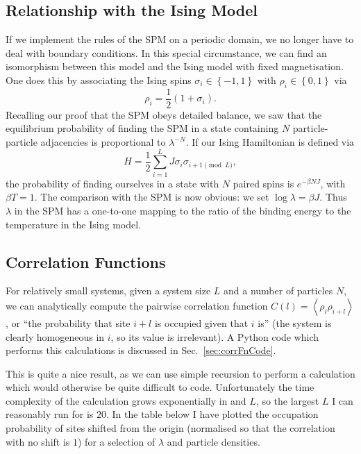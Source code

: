 \subsection{Relationship with the Ising Model} \label{sec:isingSim}
If we implement the rules of the SPM on a periodic domain, we no longer have to deal with boundary conditions. In this special circumstance, we can find an isomorphism between this model and the Ising model with fixed magnetisation.
One does this by associating the Ising spins $\sigma_i \in \left\{-1, 1 \right\}$ with $\rho_i \in \left\{ 0, 1 \right\}$ via
\begin{equation}
 \rho_i = \frac{1}{2}\left(1+\sigma_i\right).
\end{equation}
Recalling our proof that the SPM obeys detailed balance, we saw that the equilibrium probability of finding the SPM in a state containing $N$ particle-particle adjacencies is proportional to 
$\lambda^{-N}$.
If our Ising Hamiltonian is defined via
\begin{equation}
 H = \frac{1}{2} \sum_{i=1}^L J \sigma_i \sigma_{i+1 \pmod L},
\end{equation}
the probability of finding ourselves in a state with $N$ paired spins is $e^{-\beta N J}$, with $\beta T =1$. The comparison with the SPM is now obvious: we set $\log{\lambda} = \beta J$. Thus $\lambda$ in the SPM has a one-to-one mapping to the ratio of the binding energy to the temperature in the Ising model.


\subsection{Correlation Functions}
For relatively small systems, given a system size $L$ and a number of particles $N$, we can analytically compute the pairwise correlation function $C(l) = \left\langle \rho_i \rho_{i+l} \right\rangle$, or ``the probability that site $i+l$
is occupied given that $i$ is'' (the system is clearly homogeneous in $i$, so its value is irrelevant).
A Python code which performs this calculations is discussed in Sec.~\ref{sec:corrFnCode}.


This is quite a nice result, as we can use simple recursion to perform a calculation which would otherwise be quite difficult to code.
Unfortunately the time complexity of the calculation grows exponentially in and $L$, so the largest 
$L$ I can reasonably run for is $20$. In the table below I have plotted the occupation probability of sites shifted from the origin
(normalised so that the correlation with no shift is $1$)  for a selection of $\lambda$ and particle densities.


